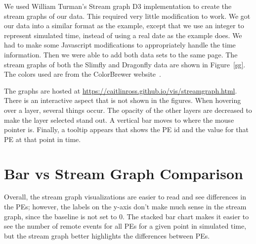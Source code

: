 \documentclass[12pt]{article}
\begin{document}
We used William Turman's Stream graph D3 implementation \cite{Stream} to create the stream graphs of our data.  This required very little modification to work.  We got our data into a similar format as the example, except that we use an integer to represent simulated time, instead of using a real date as the example does.  We had to make some Javascript modifications to appropriately handle the time information.  Then we were able to add both data sets to the same page.   The stream graphs of both the Slimfly and Dragonfly data are shown in Figure~\ref{sg}.  The colors used are from the ColorBrewer website~\cite{Colorbrewer}.

The graphs are hosted at \url{https://caitlinross.github.io/vis/streamgraph.html}.  There is an interactive aspect that is not shown in the figures.  When hovering over a layer, several things occur.  The opacity of the other layers are decreased to make the layer selected stand out.  A vertical bar moves to where the mouse pointer is.  Finally, a tooltip appears that shows the PE id and the value for that PE at that point in time.


%

\section{Bar vs Stream Graph Comparison}
 Overall, the stream graph visualizations are easier to read and see differences in the PEs; however, the labels on the y-axis don't make much sense in the stream graph, since the baseline is not set to 0.  The stacked bar chart makes it easier to see the number of remote events for all PEs for a given point in simulated time, but the stream graph better highlights the differences between PEs.  


\end{document}
